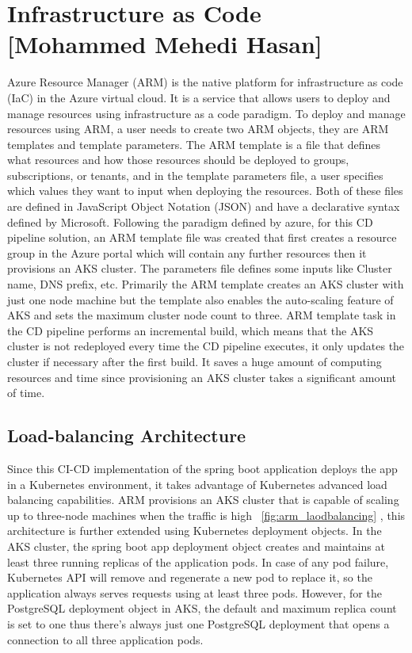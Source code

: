 \section{Infrastructure as Code [Mohammed Mehedi Hasan]}\label{sec:infrastructure_as_code}

Azure Resource Manager (ARM) is the native platform for infrastructure as code (IaC) in the Azure virtual cloud. It is a service that allows users to deploy and manage resources using infrastructure as a code paradigm. To deploy and manage resources using ARM, a user needs to create two ARM objects, they are ARM templates and template parameters. The ARM template is a file that defines what resources and how those resources should be deployed to groups, subscriptions, or tenants, and in the template parameters file, a user specifies which values they want to input when deploying the resources. Both of these files are defined in JavaScript Object Notation (JSON) and have a declarative syntax defined by Microsoft. Following the paradigm defined by azure, for this CD pipeline solution, an ARM template file was created that first creates a resource group in the Azure portal which will contain any further resources then it provisions an AKS cluster. The parameters file defines some inputs like Cluster name, DNS prefix, etc. Primarily the ARM template creates an AKS cluster with just one node machine but the template also enables the auto-scaling feature of AKS and sets the maximum cluster node count to three. ARM template task in the CD pipeline performs an incremental build, which means that the AKS cluster is not redeployed every time the CD pipeline executes, it only updates the cluster if necessary after the first build. It saves a huge amount of computing resources and time since provisioning an AKS cluster takes a significant amount of time. 

\subsection{Load-balancing Architecture}
Since this CI-CD implementation of the spring boot application deploys the app in a Kubernetes environment, it takes advantage of Kubernetes advanced load balancing capabilities. ARM provisions an AKS cluster that is capable of scaling up to three-node machines when the traffic is high ~\ref{fig:arm_laodbalancing} , this architecture is further extended using Kubernetes deployment objects. In the AKS  cluster, the spring boot app deployment object creates and maintains at least three running replicas of the application pods. In case of any pod failure, Kubernetes API will remove and regenerate a new pod to replace it, so the application always serves requests using at least three pods. However, for the PostgreSQL deployment object in AKS, the default and maximum replica count is set to one thus there's always just one PostgreSQL deployment that opens a connection to all three application pods.

